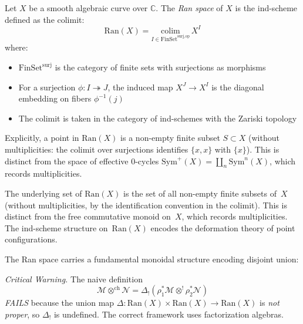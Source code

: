 \begin{definition}\label{def:ran-precise}
Let $X$ be a smooth algebraic curve over $\mathbb{C}$. The \emph{Ran space} of $X$ is the ind-scheme 
defined as the colimit:
\[
\text{Ran}(X) = \underset{I \in \text{FinSet}^{\text{surj,op}}}{\text{colim}} \, X^I
\]
where:
\begin{itemize}
\item $\text{FinSet}^{\text{surj}}$ is the category of finite sets with surjections as morphisms
\item For a surjection $\phi: I \twoheadrightarrow J$, the induced map $X^J \to X^I$ is the diagonal 
embedding on fibers $\phi^{-1}(j)$
\item The colimit is taken in the category of ind-schemes with the Zariski topology
\end{itemize}
Explicitly, a point in $\text{Ran}(X)$ is a non-empty finite subset $S \subset X$ (without multiplicities: the colimit over surjections identifies $\{x, x\}$ with $\{x\}$).  This is distinct from the space of effective 0-cycles $\text{Sym}^+(X) = \coprod_n \text{Sym}^n(X)$, which records multiplicities.
\end{definition}
 
\begin{remark}
The underlying set of $\text{Ran}(X)$ is the set of all non-empty finite subsets of~$X$
(without multiplicities, by the identification convention in the colimit).  This is distinct from
the free commutative monoid on~$X$, which records multiplicities.  The ind-scheme structure
on~$\text{Ran}(X)$ encodes the deformation theory of point configurations.
\end{remark}
 
The Ran space carries a fundamental monoidal structure encoding disjoint union:
 
\begin{definition}\label{def:factorization}
\emph{Critical Warning.} The naive definition 
\[\mathcal{M} \otimes^{\text{ch}} \mathcal{N} = \Delta_! \left( \rho_1^* \mathcal{M} \otimes^! \rho_2^* \mathcal{N} \right)\]
\emph{FAILS} because the union map $\Delta: \text{Ran}(X) \times \text{Ran}(X) \to \text{Ran}(X)$ is \emph{not proper}, 
so $\Delta_!$ is undefined. The correct framework uses factorization algebras.
\end{definition}

